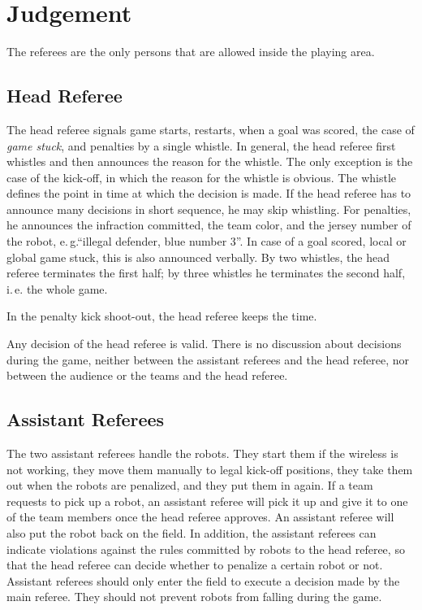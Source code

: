\documentclass[12pt]{article}
\newcommand{\ie}{\mbox{i.\,e.}\xspace}
\newcommand{\eg}{\mbox{e.\,g.}\xspace}
\begin{document}
\newpage


\section{Judgement}

The referees are the only persons that are allowed inside the playing area.

\subsection{Head Referee}

The head referee signals game starts, restarts, when a goal was scored, the case of \emph{game stuck}, and penalties by a single whistle. In general, the head referee first whistles and then announces the reason for the whistle. The only exception is the case of the kick-off, in which the reason for the whistle is obvious. The whistle defines the point in time at which the decision is made. If the head referee has to announce many decisions in short sequence, he may skip whistling. For penalties, he announces the infraction committed, the team color, and the jersey number of the robot, \eg ``illegal defender, blue number 3''. In case of a goal scored, local or global game stuck, this is also announced verbally. By two whistles, the head referee terminates the first half; by three whistles he terminates the second half, \ie the whole game.

In the penalty kick shoot-out, the head referee keeps the time.

Any decision of the head referee is valid. There is no discussion about decisions during the game, neither between the assistant referees and the head referee, nor between the audience or the teams and the head referee.

\subsection{Assistant Referees}

The two assistant referees handle the robots. They start them if the wireless is not working, they move them manually to legal kick-off positions, they take them out when the robots are penalized, and they put them in again. If a team requests to pick up a robot, an assistant referee will pick it up and give it to one of the team members once the head referee approves. An assistant referee will also put the robot back on the field. In addition, the assistant referees can indicate violations against the rules committed by robots to the head referee, so that the head referee can decide whether to penalize a certain robot or not. Assistant referees should only enter the field to execute a decision made by the main referee. They should not prevent robots from falling during the game.
\end{document}
